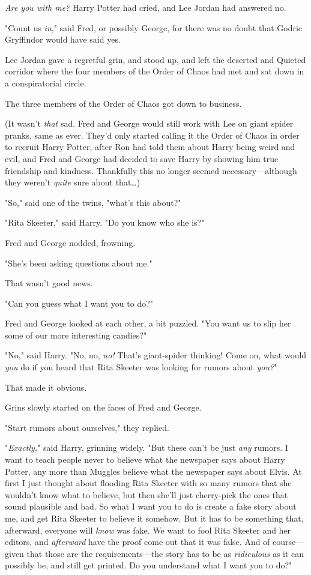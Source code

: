 \emph{Are you with me?} Harry Potter had cried, and Lee Jordan had answered no.

"Count us \emph{in}," said Fred, or possibly George, for there was no doubt 
that Godric Gryffindor would have said yes.

Lee Jordan gave a regretful grin, and stood up, and left the deserted and 
Quieted corridor where the four members of the Order of Chaos had met and sat 
down in a conspiratorial circle.

The three members of the Order of Chaos got down to business.

(It wasn't \emph{that} sad. Fred and George would still work with Lee on giant 
spider pranks, same as ever. They'd only started calling it the Order of Chaos 
in order to recruit Harry Potter, after Ron had told them about Harry being 
weird and evil, and Fred and George had decided to save Harry by showing him 
true friendship and kindness. Thankfully this no longer seemed 
necessary---although they weren't \emph{quite} sure about that{\ldots})

"So," said one of the twins, "what's this about?"

"Rita Skeeter," said Harry. "Do you know who she is?"

Fred and George nodded, frowning.

"She's been asking questions about me."

That wasn't good news.

"Can you guess what I want you to do?"

Fred and George looked at each other, a bit puzzled. "You want us to slip her 
some of our more interesting candies?"

"No," said Harry. "No, no, \emph{no!} That's giant-spider thinking! Come on, 
what would \emph{you} do if you heard that Rita Skeeter was looking for rumors 
about \emph{you?}"

That made it obvious.

Grins slowly started on the faces of Fred and George.

"Start rumors about ourselves," they replied.

"\emph{Exactly,}" said Harry, grinning widely. "But these can't be just 
\emph{any} rumors. I want to teach people never to believe what the newspaper 
says about Harry Potter, any more than Muggles believe what the newspaper says 
about Elvis. At first I just thought about flooding Rita Skeeter with so many 
rumors that she wouldn't know what to believe, but then she'll just cherry-pick 
the ones that sound plausible and bad. So what I want you to do is create a 
fake story about me, and get Rita Skeeter to believe it somehow. But it has to 
be something that, afterward, everyone will \emph{know} was fake. We want to 
fool Rita Skeeter and her editors, and \emph{afterward} have the proof come out 
that it was false. And of course---given that those are the requirements---the 
story has to be as \emph{ridiculous} as it can possibly be, and still get 
printed. Do you understand what I want you to do?"

